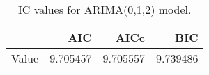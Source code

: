 \begin{table}[ht]
\centering
\begin{tabular}{rrrr}
  \hline
 & AIC & AICc & BIC \\ 
  \hline
Value & 9.705457 & 9.705557 & 9.739486 \\ 
   \hline
\end{tabular}
\caption{IC values for ARIMA(0,1,2) model.}
\end{table}